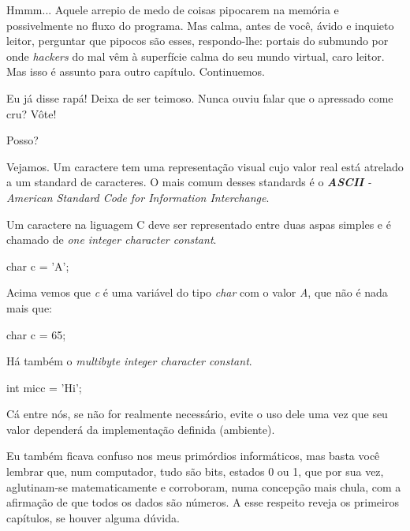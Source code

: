 
Hmmm... Aquele arrepio de medo de coisas pipocarem na memória e possivelmente
no fluxo do programa. Mas calma, antes de você, ávido e inquieto leitor,
perguntar que pipocos são esses, respondo-lhe: portais do submundo por onde
\textit{hackers} do mal vêm à superfície calma do seu mundo virtual, caro
leitor. Mas isso é assunto para outro capítulo. Continuemos.


Eu já disse rapá! Deixa de ser teimoso. Nunca ouviu falar que o apressado come
cru? Vôte!

Posso?


Vejamos. Um caractere tem uma representação visual cujo valor real está
atrelado a um standard de caracteres. O mais comum desses standards é o
\textit{\textbf{ASCII} - American Standard Code for Information Interchange}.

Um caractere na liguagem C deve ser representado entre duas aspas simples e é
chamado de \textit{one integer character constant}.

\begin{ccode}
  char c = 'A';
\end{ccode}

Acima vemos que \textit{c} é uma variável do tipo \textit{char} com o valor
\textit{A}, que não é nada mais que:

\begin{ccode}
  char c = 65;
\end{ccode}

Há também o \textit{multibyte integer character constant}.

\begin{ccode}
  int micc = 'Hi';
\end{ccode}

Cá entre nós, se não for realmente necessário, evite o uso dele uma vez que seu
valor dependerá da implementação definida (ambiente).


Eu também ficava confuso nos meus primórdios informáticos, mas basta você
lembrar que, num computador, tudo são bits, estados 0 ou 1, que por sua vez,
aglutinam-se matematicamente e corroboram, numa concepção mais chula, com a
afirmação de que todos os dados são números. A esse respeito reveja os
primeiros capítulos, se houver alguma dúvida.

